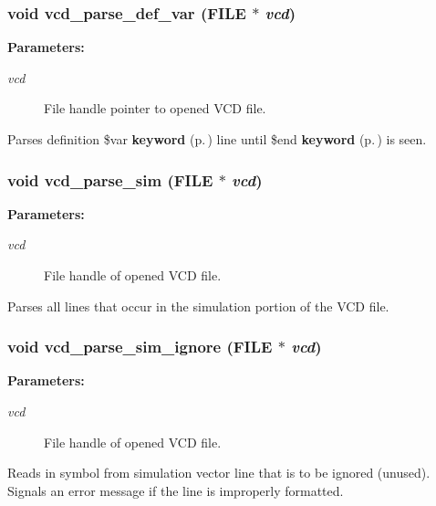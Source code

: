 \subsubsection{\setlength{\rightskip}{0pt plus 5cm}void vcd\_\-parse\_\-def\_\-var (FILE $\ast$ {\em vcd})}\label{vcd_8c_a5}


\begin{Desc}
\item[{\bf Parameters: }]\par
\begin{description}
\item[
{\em vcd}]File handle pointer to opened VCD file.

\end{description}
\end{Desc}
Parses definition \$var {\bf keyword} {\rm (p.\,\pageref{structkeyword})} line until \$end {\bf keyword} {\rm (p.\,\pageref{structkeyword})} is seen. 
\subsubsection{\setlength{\rightskip}{0pt plus 5cm}void vcd\_\-parse\_\-sim (FILE $\ast$ {\em vcd})}\label{vcd_8c_a10}


\begin{Desc}
\item[{\bf Parameters: }]\par
\begin{description}
\item[
{\em vcd}]File handle of opened VCD file.

\end{description}
\end{Desc}
Parses all lines that occur in the simulation portion of the VCD file. 
\subsubsection{\setlength{\rightskip}{0pt plus 5cm}void vcd\_\-parse\_\-sim\_\-ignore (FILE $\ast$ {\em vcd})}\label{vcd_8c_a9}


\begin{Desc}
\item[{\bf Parameters: }]\par
\begin{description}
\item[
{\em vcd}]File handle of opened VCD file.

\end{description}
\end{Desc}
Reads in symbol from simulation vector line that is to be ignored  (unused). Signals an error message if the line is improperly formatted. 
